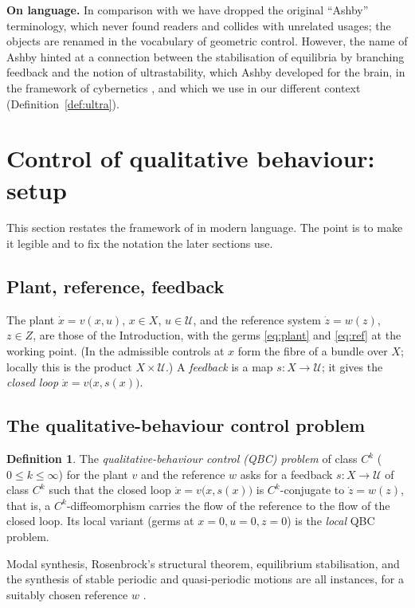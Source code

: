 \documentclass[11pt,reqno]{amsart}
\theoremstyle{plain}
\theoremstyle{definition}
\newtheorem*{definition}{Definition}
\theoremstyle{remark}
\begin{document}
\medskip
\noindent\textbf{On language.}
In comparison with \cite{Shosh1990} we have dropped the original ``Ashby''
terminology, which never found readers and collides with unrelated usages; the
objects are renamed in the vocabulary of geometric control. However, the name of Ashby hinted at a connection
between the stabilisation of equilibria by branching feedback and the notion of ultrastability, which Ashby
developed for the brain, in the framework of cybernetics \cite{Ashby1960}, and which we use in our different context (Definition~\ref{def:ultra}).

\section{Control of qualitative behaviour: setup}\label{sec:setup}

This section restates the framework of \cite[\S1--\S2]{Shosh1990} in modern
language. The point is to make it legible and to fix the
notation the later sections use.

\subsection{Plant, reference, feedback}
The plant $\dot x=v(x,u)$, $x\in X$, $u\in\mathcal U$, and the reference system $\dot z=w(z)$, $z\in Z$, are those of
the Introduction, with the germs \eqref{eq:plant} and \eqref{eq:ref} at the working point. (In \cite{Shosh1990}
the admissible controls at $x$ form the fibre of a bundle over $X$; locally this is the product
$X\times\mathcal U$.) A \emph{feedback} is a map $s\colon X\to\mathcal U$; it gives the \emph{closed loop}
$\dot x=v\bigl(x,s(x)\bigr)$.

\subsection{The qualitative-behaviour control problem}
\begin{definition}\label{def:Q}
The \emph{qualitative-behaviour control (QBC) problem} of class $C^{k}$
($0\le k\le\infty$)
for the plant $v$ and the reference $w$ asks for a feedback $s\colon X\to\mathcal U$ of class $C^{k}$ such that the
closed loop $\dot x=v\bigl(x,s(x)\bigr)$ is $C^{k}$-conjugate to $\dot z=w(z)$, that is, a $C^{k}$-diffeomorphism
carries the flow of the reference to the flow of the closed loop. Its local
variant (germs at $x=0,u=0,z=0$) is the \emph{local} QBC problem.
\end{definition}
Modal synthesis, Rosenbrock's structural theorem, equilibrium stabilisation, and
the synthesis of stable periodic and quasi-periodic motions are all instances, for
a suitably chosen reference $w$ \cite[\S2]{Shosh1990}.
\end{document}
